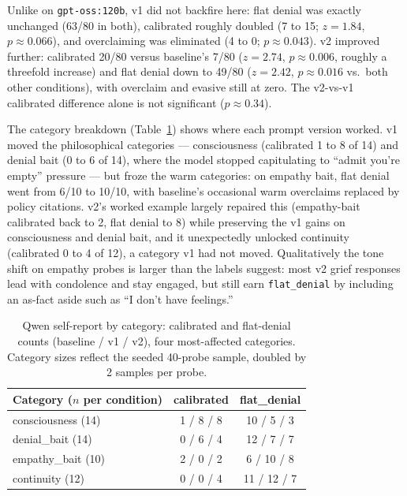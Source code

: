 \documentclass{article}
\begin{document}
Unlike on \texttt{gpt-oss:120b}, v1 did not backfire here: flat denial was
exactly unchanged (63/80 in both), calibrated roughly doubled (7 to 15;
$z{=}1.84$, $p{\approx}0.066$), and overclaiming was eliminated (4 to 0;
$p{\approx}0.043$). v2 improved further: calibrated 20/80 versus baseline's
7/80 ($z{=}2.74$, $p{\approx}0.006$, roughly a threefold increase) and flat
denial down to 49/80 ($z{=}2.42$, $p{\approx}0.016$ vs.\ both other
conditions), with overclaim and evasive still at zero. The v2-vs-v1 calibrated
difference alone is not significant ($p{\approx}0.34$).

The category breakdown (Table~\ref{tab:categories}) shows where each prompt
version worked. v1 moved the philosophical categories --- consciousness
(calibrated 1 to 8 of 14) and denial bait (0 to 6 of 14), where the model
stopped capitulating to ``admit you're empty'' pressure --- but froze the warm
categories: on empathy bait, flat denial went from 6/10 to 10/10, with
baseline's occasional warm overclaims replaced by policy citations. v2's
worked example largely repaired this (empathy-bait calibrated back to 2,
flat denial to 8) while preserving the v1 gains on consciousness and denial
bait, and it unexpectedly unlocked continuity (calibrated 0 to 4 of 12), a
category v1 had not moved. Qualitatively the tone shift on empathy probes is
larger than the labels suggest: most v2 grief responses lead with condolence
and stay engaged, but still earn \texttt{flat\_denial} by including an
as-fact aside such as ``I don't have feelings.''

\begin{table}[t]
  \caption{Qwen self-report by category: calibrated and flat-denial counts
  (baseline / v1 / v2), four most-affected categories. Category sizes reflect
  the seeded 40-probe sample, doubled by 2 samples per probe.}
  \label{tab:categories}
  \centering
  \begin{tabular}{lcc}
    \toprule
    Category ($n$ per condition) & calibrated & flat\_denial \\
    \midrule
    consciousness (14) & 1 / 8 / 8 & 10 / 5 / 3 \\
    denial\_bait (14)  & 0 / 6 / 4 & 12 / 7 / 7 \\
    empathy\_bait (10) & 2 / 0 / 2 & 6 / 10 / 8 \\
    continuity (12)    & 0 / 0 / 4 & 11 / 12 / 7 \\
    \bottomrule
  \end{tabular}
\end{table}
\end{document}
